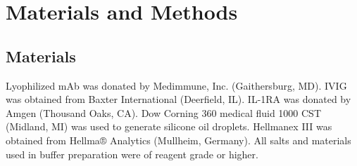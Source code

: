 \documentclass[%
reprint,
superscriptaddress,
 aps,
 pre,
]{revtex4-1}
\begin{document}
\begin{figure*} [htb]
\begin{minipage}[b]{.485\linewidth}
    \end{minipage}


    \caption{\footnotesize Sample FIM image collages from four FIM protein data sets.  Clock-wise from top left: freeze-thawed monoclonal Antibody (mAb) images;  
    mAb experiencing mechanical agitation (shaking)
    plus pH shock; intravenous immunoglobulin (IVIG) processed with a ``Pump A''; and IVIG processed with ``Pump B'' (see Sec. \ref{sec:Materials} for additional sample preparation details). A ConvNet classifier was used to distinguish these four different conditions with high accuracy (quantitative results shown in Fig. \ref{fig:tables}).
     Note the heterogeneity and polydispersity of these data sets (expert humans encounter difficulty in classifying the data based on visual inspection of single images).}
      \label{fig:rawdata}
\end{figure*}



 \section{Materials and Methods}

 \subsection{Materials}
\label{sec:Materials}

Lyophilized mAb was donated by Medimmune, Inc. (Gaithersburg, MD). IVIG was obtained from Baxter International (Deerfield, IL). IL-1RA was donated by Amgen (Thousand Oaks, CA). Dow Corning\textsuperscript{\textregistered} 360 medical fluid 1000 CST (Midland, MI) was used to generate silicone oil droplets. Hellmanex\textsuperscript{\textregistered} III was obtained from Hellma® Analytics (Mullheim, Germany). All salts and materials used in buffer preparation were of reagent grade or higher.
\end{document}
